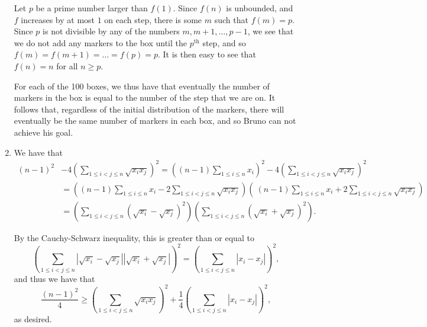 \documentclass[12pt]{article}
\begin{document}
\begin{enumerate}
Let $p$ be a prime number larger than $f(1)$. Since $f(n)$ is unbounded, and $f$
increases by at most $1$ on each step, there is some $m$ such that $f(m) = p$.
Since $p$ is not divisible by any of the numbers $m, m + 1, \dots, p - 1$, we
see that we do not add any markers to the box until the $p^\text{th}$ step, and
so $f(m) = f(m + 1) = \dots = f(p) = p$. It is then easy to see that $f(n) = n$
for all $n \geq p$.

For each of the 100 boxes, we thus have that eventually the number of markers
in the box is equal to the number of the step that we are on. It follows that,
regardless of the initial distribution of the markers, there will
eventually be the same number of markers in each box, and so Bruno can not
achieve his goal.

\item %
We have that
\begin{align*}
    (n - 1)^2 & - 4 \left(\sum_{1 \leq i < j \leq n} \sqrt{x_i x_j} \right)^2 
     = \left( (n - 1) \sum_{1 \leq i \leq n} x_i \right)^2 - 4 \left(\sum_{1
    \leq i < j \leq n} \sqrt{x_i x_j} \right)^2 \\
    & = \left( (n - 1) \sum_{1 \leq i \leq n} x_i - 2 \sum_{1 \leq i < j \leq n}
    \sqrt{x_i x_j} \right) \left( \ (n - 1) \sum_{1 \leq i \leq n} x_i + 2
    \sum_{1 \leq i < j \leq n} \sqrt{x_i x_j} \right) \\
    & = \left( \sum_{1 \leq i < j \leq n} (\sqrt{x_i} - \sqrt{x_j})^2 \right)
        \left( \sum_{1 \leq i < j \leq n} (\sqrt{x_i} + \sqrt{x_j})^2 \right).
\end{align*}

By the Cauchy-Schwarz inequality, this is greater than or equal to
\[
    \left( \sum_{1 \leq i < j \leq n} | \sqrt{x_i} - \sqrt{x_j} | | \sqrt{x_i} +
    \sqrt{x_j} | \right)^2 = \left( \sum_{1 \leq i < j \leq n} | x_i - x_j |
    \right)^2,
\]
and thus we have that
\[
    \frac{(n - 1)^2}{4} \geq \left( \sum_{1 \leq i < j \leq n} \sqrt{x_i x_j}
    \right)^2 + \frac{1}{4} \left( \sum_{1 \leq i < j \leq n} |x_i - x_j|
    \right)^2,
\]
as desired.


\end{enumerate}
\end{document}
